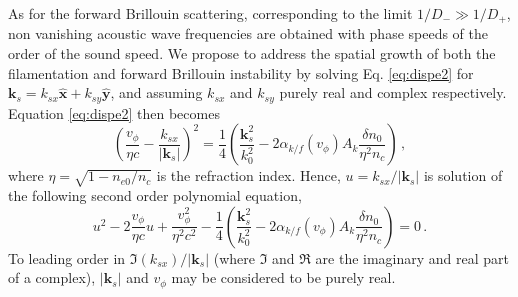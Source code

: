 \documentclass[
 reprint,
 amsmath,amssymb,
 aps,
]{revtex4-1}
\begin{document}
As for the forward Brillouin scattering,  corresponding to the limit $1/D_-\gg1/D_+$, non vanishing acoustic wave frequencies are obtained with  phase speeds of the order of the sound speed. We propose to address the spatial growth of both the filamentation and forward Brillouin instability  by solving Eq. \eqref{eq:dispe2} for  $\mathbf{k}_s = k_{sx} \hat{\mathbf{x}} +k_{sy} \hat{\mathbf{y}}$, and assuming 
$ k_{sx}$ and $k_{sy}$ purely real and complex respectively. Equation \eqref{eq:dispe2} then becomes 
\begin{equation}\label{eq:dispe3} 
\left(\frac{v_\phi}{\eta c} - 
\frac{ k_{sx}}{\vert \mathbf{k}_s\vert }\right)^2
=\frac{1}{4} \left( \frac{\mathbf{k}_s^2}{k_0^2} - 2\alpha_{k/f}(v_\phi)A_k\frac{\delta n_0}{\eta^2n_c} \right) 
\, ,
\end{equation}
where $\eta=\sqrt{1-n_{e0}/n_c}$ is the refraction index.
Hence, $u =  k_{sx}/\vert \mathbf{k}_s\vert $ is solution of the following second order polynomial equation, 
\begin{equation}\label{eq:dispe2poly} 
u^2 -2\frac{v_\phi}{\eta c}u +\frac{v_\phi^2}{\eta^2 c^2}-\frac{1}{4}\left( \frac{\mathbf{k}_s^2}{k_0^2} - 2\alpha_{k/f}(v_\phi)A_k\frac{\delta n_0}{\eta^2n_c} \right) =0 
\, .
\end{equation}
To leading order in  $\Im(k_{sx})/\vert \mathbf{k}_s\vert $ (where $\Im$ and $\Re$ are the imaginary and real part of a complex), $\vert \mathbf{k}_s\vert$ and $v_\phi$ may be considered to be purely real.
\end{document}
